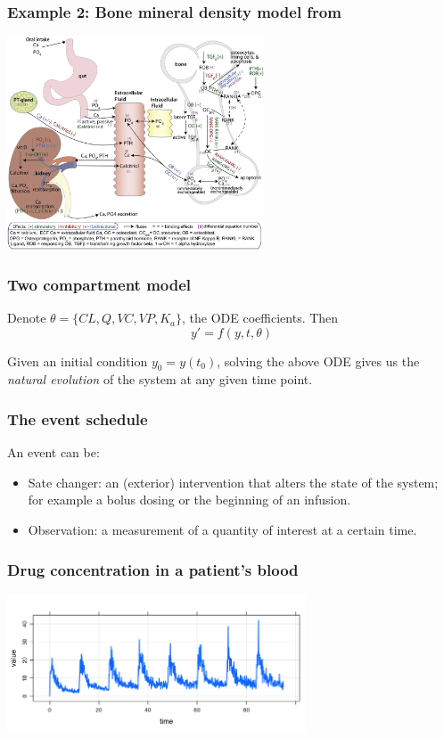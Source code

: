 \documentclass[xcolor=table]{beamer}
\begin{document}
\begin{frame}
  \frametitle{Example 2: Bone mineral density model from \cite{Peterson:2012}}
  \begin{center}
    \includegraphics[width = 3in]{../figures/RiggsBoneModel.jpg}
  \end{center}

\end{frame}

\begin{frame}
    \frametitle{Two compartment model}
    
    Denote $\theta = \{CL, Q, VC, VP, K_a \}$, the ODE coefficients.
    Then
    $$ y' = f(y, t, \theta) $$
    
    Given an initial condition $y_0 = y(t_0)$, solving the above ODE gives us
    the \textcolor{MRGGreen}{\textit{natural evolution}} of the system at any given time point.

\end{frame}

\begin{frame}
  \frametitle{The event schedule}
  
  An event can be:
  \begin{itemize}
    \item \textcolor{MRGGreen}{Sate changer}: an (exterior) intervention that alters the state of the system;
    for example a bolus dosing or the beginning of an infusion.
    \item \textcolor{MRGGreen}{Observation}: a measurement of a quantity of interest at a certain time.
  \end{itemize}

\end{frame}

\begin{frame}
  \frametitle{Drug concentration in a patient's blood}
  
  \begin{center}
    \includegraphics[width=3.5in]{../figures/multiple_doses.png}
  \end{center}

\end{frame}
\end{document}
